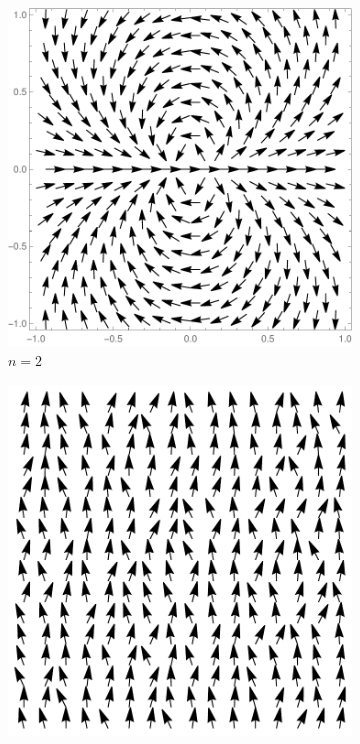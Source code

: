 \begin{figure}
	\begin{subfigure}{0.45\textwidth}
		\includegraphics[scale=1,trim= 120 100 100 100,clip]{./figures/vortexn=2.pdf}
		\caption{$n=2$}
	\end{subfigure}
	\begin{subfigure}{0.45\textwidth}
		\includegraphics[scale=1,trim= 120 100 100 100,clip]{./figures/n0conf2.pdf}

\end{subfigure}
\end{figure}
